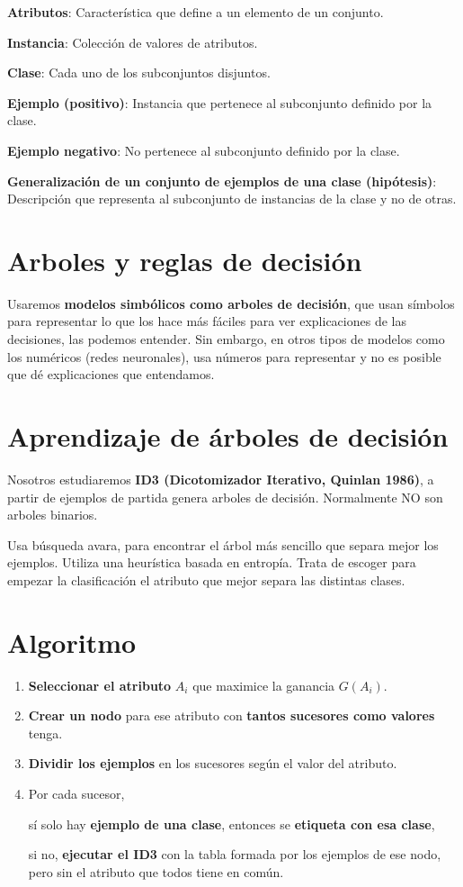 \documentclass[12pt]{report} %
\begin{document}
\textbf{Atributos}: Característica que define a un elemento de un
conjunto.

\textbf{Instancia}: Colección de valores de atributos.

\textbf{Clase}: Cada uno de los subconjuntos disjuntos.

\textbf{Ejemplo (positivo)}: Instancia que pertenece al subconjunto
definido por la clase.

\textbf{Ejemplo negativo}: No pertenece al subconjunto definido por la
clase.

\textbf{Generalización de un conjunto de ejemplos de una
clase (hipótesis)}: Descripción que representa al subconjunto de
instancias de la clase y no de otras.

\section{Arboles y reglas de
decisión}

Usaremos \textbf{modelos simbólicos como arboles de decisión}, que usan
símbolos para representar lo que los hace más fáciles para ver
explicaciones de las decisiones, las podemos entender. Sin embargo, en otros
tipos de modelos como los numéricos (redes neuronales), usa números para
representar y no es posible que dé explicaciones que entendamos.

\section{Aprendizaje de árboles de
decisión}

Nosotros estudiaremos \textbf{ID3 (Dicotomizador Iterativo, Quinlan
1986)}, a partir de ejemplos de partida genera arboles de decisión.
Normalmente NO son arboles binarios.

Usa búsqueda avara, para encontrar el árbol más sencillo que separa
mejor los ejemplos. Utiliza una heurística basada en entropía. Trata de
escoger para empezar la clasificación el atributo que mejor separa las
distintas clases.

\section{Algoritmo}

\begin{enumerate}
\def\labelenumi{\arabic{enumi}.}
\item
  \textbf{Seleccionar el atributo} \(A_i\) que maximice la ganancia
  \(G(A_i)\).
\item
  \textbf{Crear un nodo} para ese atributo con \textbf{tantos sucesores
  como valores} tenga.
\item
  \textbf{Dividir los ejemplos} en los sucesores según el valor del
  atributo.
\item
  Por cada sucesor,

  sí solo hay \textbf{ejemplo de una clase}, entonces se
  \textbf{etiqueta con esa clase},

  si no, \textbf{ejecutar el ID3} con la tabla formada por los ejemplos
  de ese nodo, pero sin el atributo que todos tiene en común.
\end{enumerate}
\end{document}
